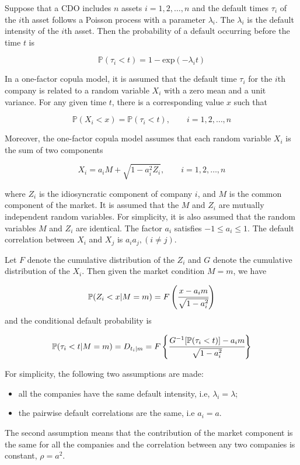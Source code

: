 Suppose that a CDO includes $n$ assets $i = 1, 2,\ldots, n$ and the default times $\tau_i$ of
the $i$th asset follows a Poisson process with a parameter $\lambda_i$. The $\lambda_i$ is the default
intensity of the $i$th asset. Then the probability of a default occurring before the
time $t$ is

\[\mathbb{P}(\tau_i \lt t) = 1 - \mathrm{exp}(-\lambda_i t)\]

In a one-factor copula model, it is assumed that the default time $\tau_i$ for the $i$th
company is related to a random variable $X_i$ with a zero mean and a unit variance.
For any given time $t$, there is a corresponding value $x$ such that

\[\mathbb{P}(X_i < x) = \mathbb{P}(\tau_i < t),\qquad i = 1, 2,\ldots, n\]

Moreover, the one-factor copula model assumes that each random variable $X_i$ is the
sum of two components

\[X_i = a_i M + \sqrt{1-a_i^2 Z_i},\qquad i = 1, 2,\ldots, n\]

where $Z_i$ is the idiosyncratic component of company $i$, and $M$ is the common component of the market. It is assumed that the $M$ and $Z_i$ are mutually independent random variables. For simplicity, it is also assumed that the random variables $M$
and $Z_i$ are identical. The factor $a_i$ satisfies $-1 \le a_i \le 1$. The default correlation
between $X_i$ and $X_j$ is $a_i a_j,(i \ne j)$.

Let $F$ denote the cumulative distribution of the $Z_i$ and $G$ denote the cumulative distribution of the $X_i$. Then given the market condition $M = m$, we have

\[\mathbb{P}(Z_i < x|M = m) = F\left(\cfrac{x-a_i m}{\sqrt{1-a_i^2}}\right)\]
and the conditional default probability is

\[\mathbb{P}(\tau_i < t|M = m) = D_{t_i |m} = F\left\{\cfrac{G^{-1}[\mathbb{P}(\tau_i < t)] - a_i m}{\sqrt{1-a_i^2}}\right\}\]

For simplicity, the following two assumptions are made:
\begin{itemize}
\item all the companies have the same default intensity, i.e, $\lambda_i = \lambda$;
\item the pairwise default correlations are the same, i.e $a_i = a$.
\end{itemize}
The second assumption means that the contribution of the market component is
the same for all the companies and the correlation between any two companies is
constant, $\rho = a^2$.

